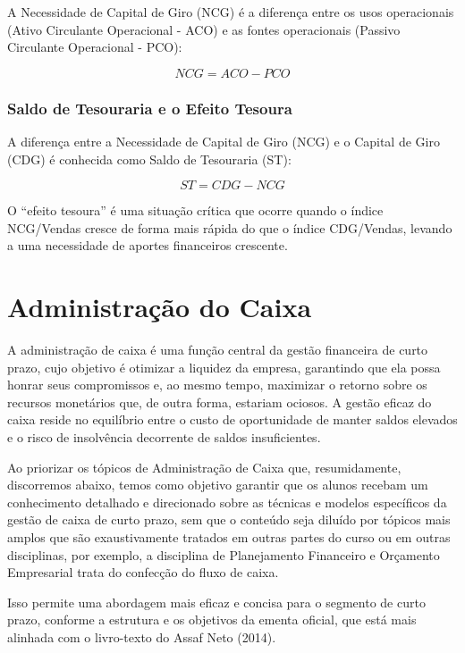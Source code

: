 \documentclass[
  a4paper,
]{book}
\begin{document}
A Necessidade de Capital de Giro (NCG) é a diferença entre os usos
operacionais (Ativo Circulante Operacional - ACO) e as fontes
operacionais (Passivo Circulante Operacional - PCO):

\[NCG = ACO - PCO\]

\subsection{Saldo de Tesouraria e o Efeito
Tesoura}\label{saldo-de-tesouraria-e-o-efeito-tesoura}

A diferença entre a Necessidade de Capital de Giro (NCG) e o Capital de
Giro (CDG) é conhecida como Saldo de Tesouraria (ST):

\[ST = CDG - NCG\]

O ``efeito tesoura'' é uma situação crítica que ocorre quando o índice
NCG/Vendas cresce de forma mais rápida do que o índice CDG/Vendas,
levando a uma necessidade de aportes financeiros crescente.


\chapter{Administração do Caixa}\label{sec-caixa}

A administração de caixa é uma função central da gestão financeira de
curto prazo, cujo objetivo é otimizar a liquidez da empresa, garantindo
que ela possa honrar seus compromissos e, ao mesmo tempo, maximizar o
retorno sobre os recursos monetários que, de outra forma, estariam
ociosos. A gestão eficaz do caixa reside no equilíbrio entre o custo de
oportunidade de manter saldos elevados e o risco de insolvência
decorrente de saldos insuficientes.

Ao priorizar os tópicos de Administração de Caixa que, resumidamente,
discorremos abaixo, temos como objetivo garantir que os alunos recebam
um conhecimento detalhado e direcionado sobre as técnicas e modelos
específicos da gestão de caixa de curto prazo, sem que o conteúdo seja
diluído por tópicos mais amplos que são exaustivamente tratados em
outras partes do curso ou em outras disciplinas, por exemplo, a
disciplina de Planejamento Financeiro e Orçamento Empresarial trata do
confecção do fluxo de caixa.

Isso permite uma abordagem mais eficaz e concisa para o segmento de
curto prazo, conforme a estrutura e os objetivos da ementa oficial, que
está mais alinhada com o livro-texto do Assaf Neto (2014).
\end{document}
